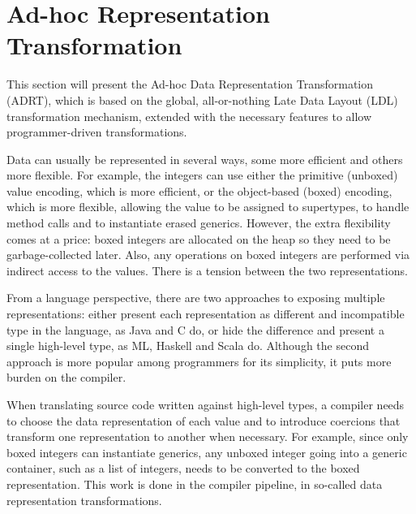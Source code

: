\section{Ad-hoc Representation Transformation}
\label{sec:ildl}

This section will present the Ad-hoc Data Representation Transformation (ADRT), which is based on the global, all-or-nothing Late Data Layout (LDL) transformation mechanism, extended with the necessary features to allow programmer-driven transformations.

Data can usually be represented in several ways, some more efficient and others more flexible. For example, the integers can use either the primitive (unboxed) value encoding, which is more efficient, or the object-based (boxed) encoding, which is more flexible, allowing the value to be assigned to supertypes, to handle method calls and to instantiate erased generics. However, the extra flexibility comes at a price: boxed integers are allocated on the heap so they need to be garbage-collected later. Also, any operations on boxed integers are performed via indirect access to the values. There is a tension between the two representations.

From a language perspective, there are two approaches to exposing multiple representations: either present each representation as different and incompatible type in the language, as Java and C do, or hide the difference and present a single high-level type, as ML, Haskell and Scala do. Although the second approach is more popular among programmers for its simplicity, it puts more burden on the compiler.

When translating source code written against high-level types, a compiler needs to choose the data representation of each value and to introduce coercions that transform one representation to another when necessary. For example, since only boxed integers can instantiate generics, any unboxed integer going into a generic container, such as a list of integers, needs to be converted to the boxed representation. This work is done in the compiler pipeline, in so-called data representation transformations.

